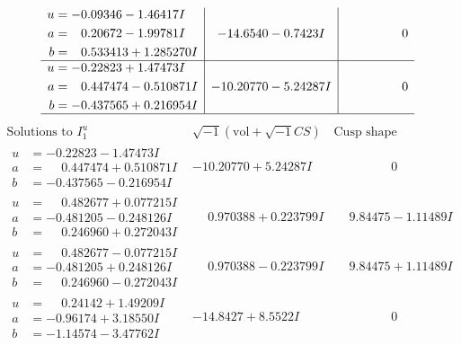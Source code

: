 \documentclass[1p]{elsarticle_modified}
\theoremstyle{definition}
\newcommand{\I}{\sqrt{-1}}
\begin{document}
$$\begin{array}{c|c|c}
\begin{aligned}
u &= -0.09346 - 1.46417 I \\
a &= \phantom{-}0.20672 - 1.99781 I \\
b &= \phantom{-}0.533413 + 1.285270 I\end{aligned}
 & -14.6540 - 0.7423 I & \phantom{-0.000000 } 0 \\ \hline\begin{aligned}
u &= -0.22823 + 1.47473 I \\
a &= \phantom{-}0.447474 - 0.510871 I \\
b &= -0.437565 + 0.216954 I\end{aligned}
 & -10.20770 - 5.24287 I & \phantom{-0.000000 } 0\\
 \hline 
 \end{array}$$\newpage$$\begin{array}{c|c|c}  
\text{Solutions to }I^u_{1}& \I (\text{vol} + \sqrt{-1}CS) & \text{Cusp shape}\\
 \hline 
\begin{aligned}
u &= -0.22823 - 1.47473 I \\
a &= \phantom{-}0.447474 + 0.510871 I \\
b &= -0.437565 - 0.216954 I\end{aligned}
 & -10.20770 + 5.24287 I & \phantom{-0.000000 } 0 \\ \hline\begin{aligned}
u &= \phantom{-}0.482677 + 0.077215 I \\
a &= -0.481205 - 0.248126 I \\
b &= \phantom{-}0.246960 + 0.272043 I\end{aligned}
 & \phantom{-}0.970388 + 0.223799 I & \phantom{-}9.84475 - 1.11489 I \\ \hline\begin{aligned}
u &= \phantom{-}0.482677 - 0.077215 I \\
a &= -0.481205 + 0.248126 I \\
b &= \phantom{-}0.246960 - 0.272043 I\end{aligned}
 & \phantom{-}0.970388 - 0.223799 I & \phantom{-}9.84475 + 1.11489 I \\ \hline\begin{aligned}
u &= \phantom{-}0.24142 + 1.49209 I \\
a &= -0.96174 + 3.18550 I \\
b &= -1.14574 - 3.47762 I\end{aligned}
 & -14.8427 + 8.5522 I & \phantom{-0.000000 } 0 \\ \hline\begin{aligned}

\end{aligned}
\end{array}$$
\end{document}
